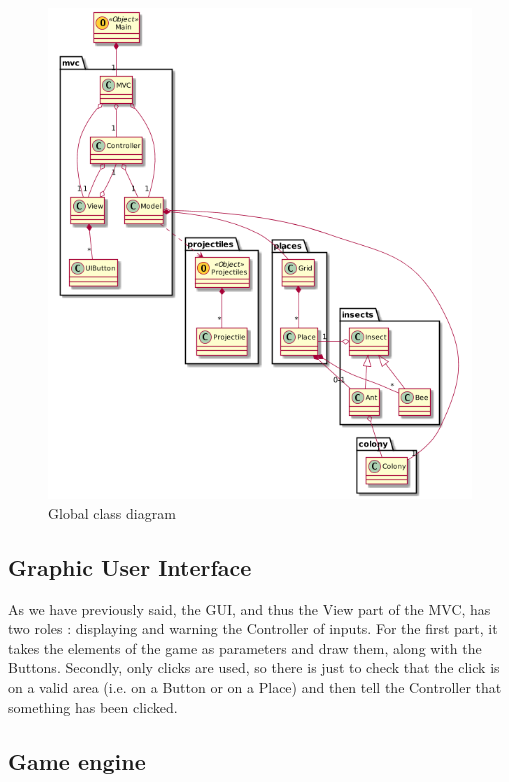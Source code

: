 \documentclass[a4paper]{article}
\begin{document}
\begin{figure}[H]
	\centering
	\includegraphics[scale=0.7]{classDiagram.png}
	\caption{Global class diagram}
	\label{classDiagram}
\end{figure}

	\subsection{Graphic User Interface}
	As we have previously said, the GUI, and thus the View part of the MVC, has two roles : displaying and warning the Controller of inputs. For the first part, it takes the elements of the game as parameters and draw them, along with the Buttons. Secondly, only clicks are used, so there is just to check that the click is on a valid area (i.e. on a Button or on a Place) and then tell the Controller that something has been clicked.
	
	\subsection{Game engine}
	
\end{document}
